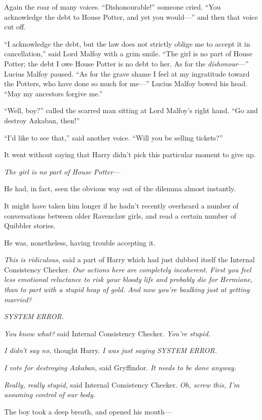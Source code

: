 Again the roar of many voices. “Dishonourable!” someone cried. “You acknowledge the debt to House Potter, and yet you would—” and then that voice cut off.

“I acknowledge the debt, but the law does not strictly oblige me to accept it in cancellation,” said Lord Malfoy with a grim smile. “The girl is no part of House Potter; the debt I owe House Potter is no debt to her. As for the \emph{dishonour}—” Lucius Malfoy paused. “As for the grave shame I feel at my ingratitude toward the Potters, who have done so much for me—” Lucius Malfoy bowed his head. “May my ancestors forgive me.”

“Well, boy?” called the scarred man sitting at Lord Malfoy’s right hand. “Go and destroy Azkaban, then!”

“I’d like to see that,” said another voice. “Will you be selling tickets?”

It went without saying that Harry didn’t pick this particular moment to give up.

\emph{The girl is no part of House Potter—}

He had, in fact, seen the obvious way out of the dilemma almost instantly.

It might have taken him longer if he hadn’t recently overheard a number of conversations between older Ravenclaw girls, and read a certain number of Quibbler stories.

He was, nonetheless, having trouble accepting it.

\emph{This is ridiculous,} said a part of Harry which had just dubbed itself the Internal Consistency Checker. \emph{Our actions here are completely incoherent. First you feel less emotional reluctance to risk your bloody \emph{life} and probably \emph{die} for Hermione, than to part with a stupid heap of gold. And now you’re baulking just at getting married?}

\emph{SYSTEM ERROR.}

\emph{You know what?} said Internal Consistency Checker. \emph{You’re stupid.}

\emph{I didn’t say no,} thought Harry. \emph{I was just saying SYSTEM ERROR.}

\emph{I vote for destroying Azkaban,} said Gryffindor. \emph{It needs to be done anyway.}

\emph{Really, really stupid,} said Internal Consistency Checker. \emph{Oh, screw this, I’m assuming control of our body.}

The boy took a deep breath, and opened his mouth—

